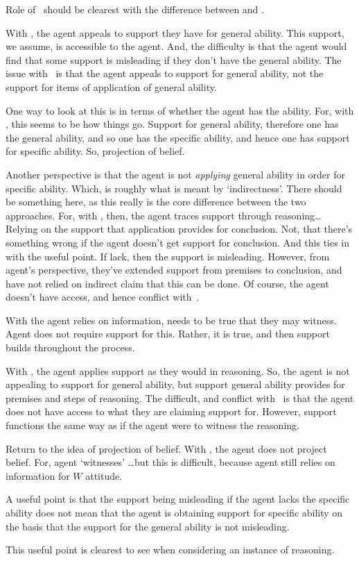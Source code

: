 \begin{note}[\WR{} and \AR{}]
  Role of~\nI{} should be clearest with the difference between \AR{} and \WR{}.

  With \AR{}, the agent appeals to support they have for general ability.
  This support, we assume, is accessible to the agent.
  And, the difficulty is that the agent would find that some support is misleading if they don't have the general ability.
  The issue with~\nI{} is that the agent appeals to support for general ability, not the support for items of application of general ability.

  One way to look at this is in terms of whether the agent has the ability.
  For, with \AR{}, this seems to be how things go.
  Support for general ability, therefore one has the general ability, and so one has the specific ability, and hence one has support for specific ability.
  So, projection of belief.

  Another perspective is that the agent is not \emph{applying} general ability in order for specific ability.
  Which, is roughly what is meant by `indirectness'.
  There should be something here, as this really is the core difference between the two approaches.
  For, with \WR{}, then, the agent traces support through reasoning\dots
  Relying on the support that application provides for conclusion.
  Not, that there's something wrong if the agent doesn't get support for conclusion.
  And this ties in with the useful point.
  If lack, then the support is misleading.
  However, from agent's perspective, they've extended support from premises to conclusion, and have not relied on indirect claim that this can be done.
  Of course, the agent doesn't have access, and hence conflict with~\uRa{}.

  With \WR{} the agent relies on information, needs to be true that they may witness.
  Agent does not require support for this.
  Rather, it is true, and then support builds throughout the process.


  With \WR{}, the agent applies support as they would in reasoning.
  So, the agent is not appealing to support for general ability, but support general ability provides for premises and steps of reasoning.
  The difficult, and conflict with~\uRa{} is that the agent does not have access to what they are claiming support for.
  However, support functions the same way as if the agent were to witness the reasoning.

  Return to the idea of projection of belief.
  With \WR{}, the agent does not project belief.
  For, agent `witnesses' \dots but this is difficult, because agent still relies on information for \(W\) attitude.
  


  A useful point is that the support being misleading if the agent lacks the specific ability does not mean that the agent is obtaining support for specific ability on the basis that the support for the general ability is not misleading.

  This useful point is clearest to see when considering an instance of reasoning.
  
\end{note}

